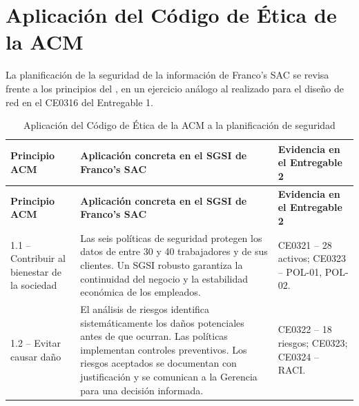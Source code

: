 \documentclass[11pt, a4paper, oneside]{report}
\begin{document}
\section{Aplicación del Código de Ética de la ACM}

La planificación de la seguridad de la información de Franco's SAC se revisa frente a los principios del \citet{acmcode}, en un ejercicio análogo al realizado para el diseño de red en el CE0316 del Entregable 1.

\renewcommand{\arraystretch}{1.3}
\footnotesize
{}

\begin{xltabular}{\textwidth}{@{}|L{3.6cm}|X|L{3.4cm}|@{}}
\caption{Aplicación del Código de Ética de la ACM a la planificación de seguridad}
\label{tab:aplicacion_acm_e2} \\

\parbox[c][1.1cm][c]{\linewidth}{\centering\color{white}\bfseries\small Principio ACM} &
\parbox[c][1.1cm][c]{\linewidth}{\centering\color{white}\bfseries\small Aplicación concreta en el SGSI de Franco's SAC} &
\parbox[c][1.1cm][c]{\linewidth}{\centering\color{white}\bfseries\small Evidencia en el Entregable 2} \\ \hline
\endfirsthead

\parbox[c][1.1cm][c]{\linewidth}{\centering\color{white}\bfseries\small Principio ACM} &
\parbox[c][1.1cm][c]{\linewidth}{\centering\color{white}\bfseries\small Aplicación concreta en el SGSI de Franco's SAC} &
\parbox[c][1.1cm][c]{\linewidth}{\centering\color{white}\bfseries\small Evidencia en el Entregable 2} \\ \hline
\endhead

\hline
\endfoot

{\small 1.1 -- Contribuir al bienestar de la sociedad} & {\small Las seis políticas de seguridad protegen los datos de entre 30 y 40 trabajadores y de sus clientes. Un SGSI robusto garantiza la continuidad del negocio y la estabilidad económica de los empleados.} & {\small CE0321 -- 28 activos; CE0323 -- POL-01, POL-02.} \\ \hline

{\small 1.2 -- Evitar causar daño} & {\small El análisis de riesgos identifica sistemáticamente los daños potenciales antes de que ocurran. Las políticas implementan controles preventivos. Los riesgos aceptados se documentan con justificación y se comunican a la Gerencia para una decisión informada.} & {\small CE0322 -- 18 riesgos; CE0323; CE0324 -- RACI.} \\ \hline


\end{xltabular}
\end{document}
